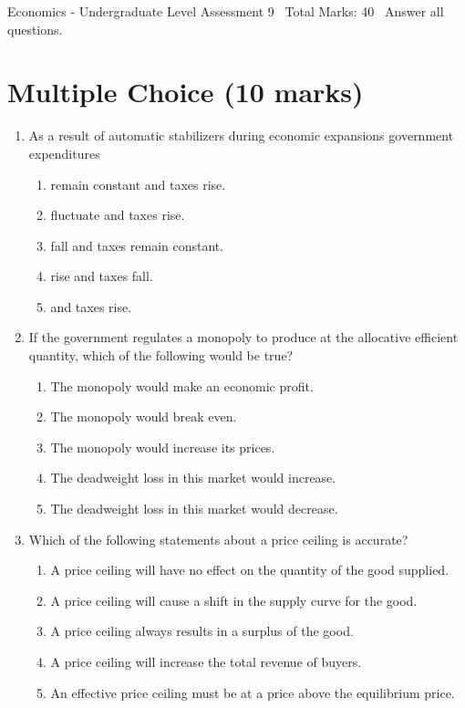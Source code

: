 \documentclass[12pt]{article}
\begin{document}
\begin{center}
Economics - Undergraduate Level Assessment 9 \
Total Marks: 40 \
Answer all questions.
\end{center}

\section*{Multiple Choice (10 marks)}
\begin{enumerate}[label=\arabic*.]
\item As a result of automatic stabilizers during economic expansions government expenditures
\begin{enumerate}[label=(\alph*)]
    \item remain constant and taxes rise.
    \item fluctuate and taxes rise.
    \item fall and taxes remain constant.
    \item rise and taxes fall.
    \item and taxes rise.
\end{enumerate}
\item If the government regulates a monopoly to produce at the allocative efficient quantity, which of the following would be true?
\begin{enumerate}[label=(\alph*)]
    \item The monopoly would make an economic profit.
    \item The monopoly would break even.
    \item The monopoly would increase its prices.
    \item The deadweight loss in this market would increase.
    \item The deadweight loss in this market would decrease.
\end{enumerate}
\item Which of the following statements about a price ceiling is accurate?
\begin{enumerate}[label=(\alph*)]
    \item A price ceiling will have no effect on the quantity of the good supplied.
    \item A price ceiling will cause a shift in the supply curve for the good.
    \item A price ceiling always results in a surplus of the good.
    \item A price ceiling will increase the total revenue of buyers.
    \item An effective price ceiling must be at a price above the equilibrium price.

\end{enumerate}
\end{enumerate}
\end{document}
